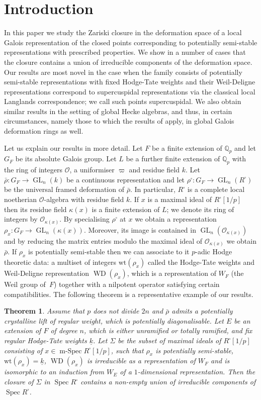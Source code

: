 \documentclass[11pt]{article}
\let\mathcal\mathscr
\newcommand{\ssquare}{{\scriptscriptstyle\square}}
\newtheorem{thm}[prop]{Theorem}
\theoremstyle{definition}
\DeclareMathOperator{\GL}{GL}
\DeclareMathOperator{\WD}{WD}
\DeclareMathOperator{\Spec}{Spec}
\DeclareMathOperator{\mSpec}{m-Spec}
\newcommand{\Qp}{\mathbb {Q}_p}
\newcommand{\cO}{\mathcal{O}}
\newcommand{\wt}{\mathrm{wt}}
\newcommand{\rhobar}{\bar{\rho}}
\begin{document}
\section{Introduction} In this paper we study the Zariski closure in the deformation space
of a local Galois representation of the closed points corresponding to potentially semi-stable representations with prescribed properties. We show in a number of cases that the closure contains a union of irreducible components of the deformation space. Our results are most novel in the case when the family consists of potentially semi-stable representations with fixed Hodge-Tate weights and their Weil-Deligne representations correspond to supercuspidal representations via the classical local Langlands correspondence; we call such points supercuspidal. We also obtain similar results in the setting of global Hecke algebras, and thus,
in certain circumstances, namely those to which the results of \cite{HMS} apply, in global
Galois deformation rings as well.

Let us explain our results in more detail. Let $F$ be a finite extension of $\Qp$ and let $G_F$ be its absolute Galois group. Let $L$ be a
further finite extension of $\Qp$ with the ring of integers $\cO$, a uniformiser $\varpi$ and residue field $k$. Let $\rhobar: G_F \to \GL_n(k)$ be a continuous representation
and let $\rho^\ssquare: G_F\to \GL_n(R^\ssquare)$ be the universal framed
deformation of $\rhobar$. In particular, $R^\ssquare$ is a complete local noetherian
$\cO$-algebra with residue field $k$. If $x$ is a maximal ideal of $R^\ssquare [1/p]$ then
its residue field $\kappa(x)$ is a finite extension of $L$; we denote its ring of integers by $\cO_{\kappa(x)}$. By specialising $\rho^\ssquare$ at
$x$ we obtain a representation $\rho_x: G_F\to \GL_n(\kappa(x))$. Moreover,
its image is contained in $\GL_n(\cO_{\kappa(x)})$ and by reducing the matrix entries modulo
the maximal ideal of $\cO_{\kappa(x)}$ we obtain $\rhobar$. If $\rho_x$ is potentially semi-stable then we can associate to it $p$-adic Hodge theoretic data: a multiset of integers
$\wt(\rho_x)$ called the Hodge-Tate weights and Weil-Deligne representation
$\WD(\rho_x)$, which is a representation of $W_F$ (the Weil group of~$F$)
together with a nilpotent operator satisfying certain compatibilities. The following theorem is a representative example of our results.

\begin{thm}\label{A} Assume that $p$ does not divide $2n$ and $\rhobar$ admits a potentially crystalline lift of regular weight, which is
potentially diagonalisable. Let $E$ be an extension of $F$ of degree $n$, which is either unramified or totally ramified, and fix regular Hodge-Tate weights $\underline{k}$.
Let $\Sigma$ be the subset of maximal ideals of $R^\ssquare [1/p]$ consisting of $x\in \mSpec R^\ssquare [1/p]$, such that $\rho_x$ is potentially semi-stable, $\wt(\rho_x)= \underline{k}$,
$\WD(\rho_x)$ is irreducible as a representation of $W_F$ and is isomorphic to an induction from $W_E$ of a $1$-dimensional representation. Then the closure of $\Sigma$ in $\Spec R^\ssquare$ contains a non-empty
union of irreducible components of $\Spec R^\ssquare$.
\end{thm}
\end{document}
